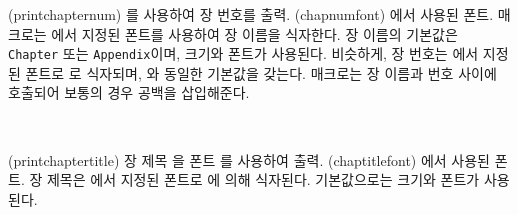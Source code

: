 \glossary(printchapternum)%
  {}%
  {를 사용하여 장 번호를 출력.}
\glossary(chapnumfont)%
  {}%
  {에서 사용된 폰트.}
\cmd{\printchaptername} 매크로는 \cmd{\chapnamefont}에서 지정된
폰트를 사용하여 장 이름을 식자한다.
장 이름의 기본값은 \texttt{Chapter} 또는 \texttt{Appendix}이며,
\cmd{\huge} 크기와 \cmd{\bfseries} 폰트가 사용된다.
비슷하게, 장 번호는 \cmd{\chapnumfont}에서 지정된 폰트로
\cmd{\printchapternum}로 식자되며,
\cmd{\chapnamefont}와 동일한 기본값을 갖는다.
\cmd{\chapternamenum} 매크로는 장 이름과 번호 사이에 호출되어
보통의 경우 공백을 삽입해준다.


\begin{syntax}
\cmd{\printchaptertitle} \cmd{\chaptitlefont} \\
\end{syntax}
\glossary(printchaptertitle)%
  {}%
  {장 제목 을 폰트 를 사용하여 출력.}
\glossary(chaptitlefont)%
  {}%
  {에서 사용된 폰트.}
장 제목은 \cmd{\chaptitlefont}에서 지정된 폰트로
\cmd{\printchaptertitle}에 의해 식자된다.
기본값으로는 \cmd{\Huge} 크기와 \cmd{\bfseries} 폰트가 사용된다.

